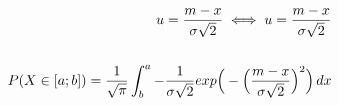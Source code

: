\documentclass[preview]{standalone}
\begin{document}
\begin{align*}
u = {{m-x} \over {\sigma \sqrt{2}} }\iff u = {{m-x} \over {\sigma \sqrt{2}} }\\ \\ P( X \in [a;b] ) = { \frac{1}{\sqrt{\pi}} } \int_b^a { { - \frac{1}{\sigma \sqrt{2}} } exp\Big(-{ \Big( \frac{m - x}{\sigma \sqrt{2}} \Big)^2 }\Big) } \, dx
\end{align*}
\end{document}
